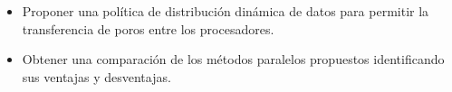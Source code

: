 \begin{itemize}
\item {Proponer una pol\'itica de distribuci\'on din\'amica de datos para permitir la transferencia de poros entre los procesadores}. 

\item {Obtener una comparaci\'on de los m\'etodos paralelos propuestos identificando sus ventajas y desventajas}. 
\end{itemize}






